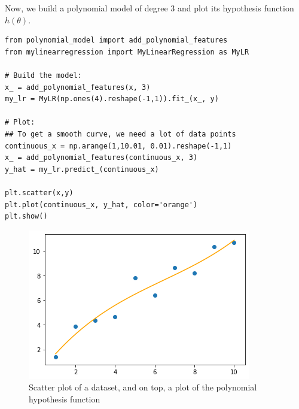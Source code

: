 Now, we build a polynomial model of degree 3 and plot its hypothesis function $h(\theta)$.

\begin{verbatim}
from polynomial_model import add_polynomial_features
from mylinearregression import MyLinearRegression as MyLR

# Build the model:
x_ = add_polynomial_features(x, 3)
my_lr = MyLR(np.ones(4).reshape(-1,1)).fit_(x_, y)

# Plot:
## To get a smooth curve, we need a lot of data points
continuous_x = np.arange(1,10.01, 0.01).reshape(-1,1)
x_ = add_polynomial_features(continuous_x, 3)
y_hat = my_lr.predict_(continuous_x)

plt.scatter(x,y)
plt.plot(continuous_x, y_hat, color='orange')
plt.show()
\end{verbatim}

\begin{figure}[!h]
    \centering
    \includegraphics[scale=0.6]{assets/ex12_plot.png}
    \caption{Scatter plot of a dataset, and on top, a plot of the polynomial hypothesis function}
\end{figure}
